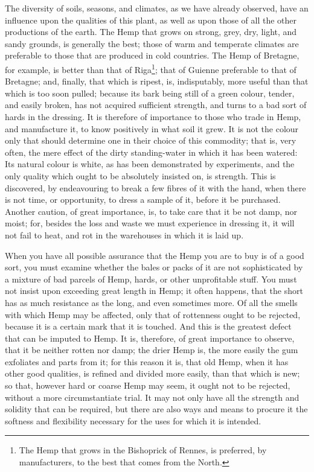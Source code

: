 \documentclass[a4paper, 11pt, oneside, polutonikogreek, english]{article}
\begin{document}
The diversity of soils, seasons, and climates, as we have already observed, have an influence upon the qualities of this plant, as well as upon those of all the other productions of the earth. The Hemp that grows on strong, grey, dry, light, and sandy grounds, is generally the best; those of warm and temperate climates are preferable to those that are produced in cold countries. The Hemp of Bretagne, for example, is better than that of Riga\footnote{The Hemp that grows in the Bishoprick of Rennes, is preferred, by manufacturers, to the best that comes from the North.}; that of Guienne preferable to that of Bretagne; and, finally, that which is ripest, is, indisputably, more useful than that which is too soon pulled; because its bark being still of a green colour, tender, and easily broken, has not acquired sufficient strength, and turns to a bad sort of hards in the dressing. It is therefore of importance to those who trade in Hemp, and manufacture it, to know positively in what soil it grew. It is not the colour only that should determine one in their choice of this commodity; that is, very often, the mere effect of the dirty standing-water in which it has been watered: Its natural colour is white, as has been demonstrated by experiments, and the only quality which ought to be absolutely insisted on, is strength. This is discovered, by endeavouring to break a few fibres of it with the hand, when there is not time, or opportunity, to dress a sample of it, before it be purchased. Another caution, of great importance, is, to take care that it be not damp, nor moist; for, besides the loss and waste we must experience in dressing it, it will not fail to heat, and rot in the warehouses in which it is laid up.

When you have all possible assurance that the Hemp you are to buy is of a good sort, you must examine whether the bales or packs of it are not sophisticated by a mixture of bad parcels of Hemp, hards, or other unprofitable stuff. You must not insist upon exceeding great length in Hemp; it often happens, that the short has as much resistance as the long, and even sometimes more. Of all the smells with which Hemp may be affected, only that of rottenness ought to be rejected, because it is a certain mark that it is touched. And this is the greatest defect that can be imputed to Hemp. It is, therefore, of great importance to observe, that it be neither rotten nor damp; the drier Hemp is, the more easily the gum exfoliates and parts from it; for this reason it is, that old Hemp, when it has other good qualities, is refined and divided more easily, than that which is new; so that, however hard or coarse Hemp may seem, it ought not to be rejected, without a more circumstantiate trial. It may not only have all the strength and solidity that can be required, but there are also ways and means to procure it the softness and flexibility necessary for the uses for which it is intended.
\end{document}
